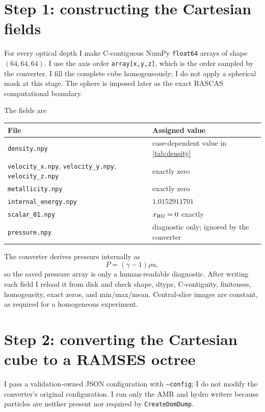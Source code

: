 \documentclass[11pt,a4paper]{article}
\begin{document}
\section{Step 1: constructing the Cartesian fields}

For every optical depth I make C-contiguous NumPy \texttt{float64} arrays of
shape $(64,64,64)$.  I use the axis order \texttt{array[x,y,z]}, which is the
order sampled by the converter.  I fill the complete cube homogeneously; I do
not apply a spherical mask at this stage.  The sphere is imposed later as the
exact RASCAS computational boundary.

The fields are
\begin{center}
\begin{tabular}{ll}
\toprule
File & Assigned value\\
\midrule
\texttt{density.npy} & case-dependent value in \ref{tab:density}\\
\texttt{velocity\_x.npy}, \texttt{velocity\_y.npy}, \texttt{velocity\_z.npy} & exactly zero\\
\texttt{metallicity.npy} & exactly zero\\
\texttt{internal\_energy.npy} & $1.0152911701$\\
\texttt{scalar\_01.npy} & $x_{\rm HII}=0$ exactly\\
\texttt{pressure.npy} & diagnostic only; ignored by the converter\\
\bottomrule
\end{tabular}
\end{center}

The converter derives pressure internally as
\begin{equation}
P=(\gamma-1)\rho u,
\end{equation}
so the saved pressure array is only a human-readable diagnostic.  After writing
each field I reload it from disk and check shape, dtype, C-contiguity, finiteness,
homogeneity, exact zeros, and min/max/mean.  Central-slice images are constant,
as required for a homogeneous experiment.

\section{Step 2: converting the Cartesian cube to a RAMSES octree}

I pass a validation-owned JSON configuration with \texttt{--config}; I do not
modify the converter's original configuration.  I run only the AMR and hydro
writers because particles are neither present nor required by
\texttt{CreateDomDump}.
\end{document}
